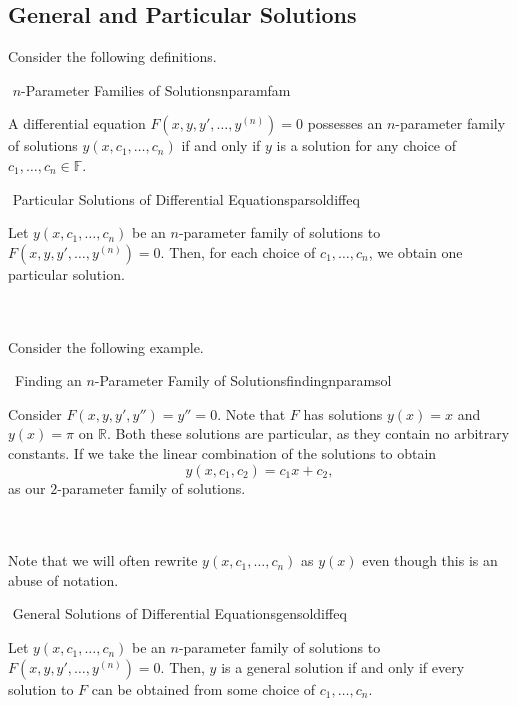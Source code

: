     \subsection{General and Particular Solutions}
    
        Consider the following definitions.
        \begin{definition}{\Stop\,\,\(n\)-Parameter Families of Solutions}{nparamfam}

            A differential equation \(F(x,y,y',\ldots,y^{(n)})=0\) possesses an \(n\)-parameter family of solutions \(y(x,c_1,\ldots,c_n)\) if and only if \(y\) is a solution for any choice of \(c_1,\ldots,c_n\in\mathbb{F}\).
            
        \end{definition}
        \begin{definition}{\Stop\,\,Particular Solutions of Differential Equations}{parsoldiffeq}

            Let \(y(x,c_1,\ldots,c_n)\) be an \(n\)-parameter family of solutions to \(F(x,y,y',\ldots,y^{(n)})=0\). Then, for each choice of \(c_1,\ldots,c_n\), we obtain one particular solution.
            
        \end{definition}
        \vphantom
        \\
        \\
        Consider the following example.
        \begin{example}{\Difficulty\,\Difficulty\,\,Finding an \(n\)-Parameter Family of Solutions}{findingnparamsol}

            Consider \(F(x,y,y',y'')=y''=0\). Note that \(F\) has solutions \(y(x)=x\) and \(y(x)=\pi\) on \(\mathbb{R}\). Both these solutions are particular, as they contain no arbitrary constants. If we take the linear combination of the solutions to obtain
            \begin{equation*}
                y(x,c_1,c_2)=c_1x+c_2,
            \end{equation*}
            as our \(2\)-parameter family of solutions.
            
        \end{example}
        \vphantom
        \\
        \\
        Note that we will often rewrite \(y(x,c_1,\ldots,c_n)\) as \(y(x)\) even though this is an abuse of notation.
        \begin{definition}{\Stop\,\,General Solutions of Differential Equations}{gensoldiffeq}

            Let \(y(x,c_1,\ldots,c_n)\) be an \(n\)-parameter family of solutions to \(F(x,y,y',\ldots,y^{(n)})=0\). Then, \(y\) is a general solution if and only if every solution to \(F\) can be obtained from some choice of \(c_1,\ldots,c_n\).
            
        \end{definition}
